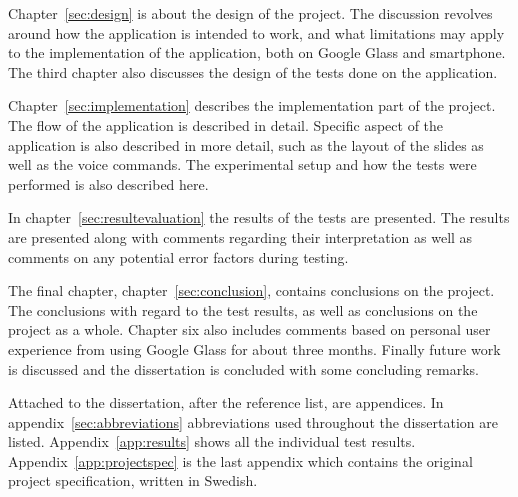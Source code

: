 Chapter~\ref{sec:design} is about the design of the project. The discussion revolves around how the application is intended to work, and what limitations may apply to the implementation of the application, both on Google Glass and smartphone. The third chapter also discusses the design of the tests done on the application.

Chapter~\ref{sec:implementation} describes the implementation part of the project. The flow of the application is described in detail. Specific aspect of the application is also described in more detail, such as the layout of the slides as well as the voice commands. The experimental setup and how the tests were performed is also described here.

In chapter~\ref{sec:resultevaluation} the results of the tests are presented. The results are presented along with comments regarding their interpretation as well as comments on any potential error factors during testing.

The final chapter, chapter~\ref{sec:conclusion}, contains conclusions on the project. The conclusions with regard to the test results, as well as conclusions on the project as a whole. Chapter six also includes comments based on personal user experience from using Google Glass for about three months. Finally future work is discussed and the dissertation is concluded with some concluding remarks.

Attached to the dissertation, after the reference list, are appendices. In appendix~\ref{sec:abbreviations} abbreviations used throughout the dissertation are listed. Appendix~\ref{app:results} shows all the individual test results. %
Appendix~\ref{app:projectspec} is the last appendix which contains the original project specification, written in Swedish.